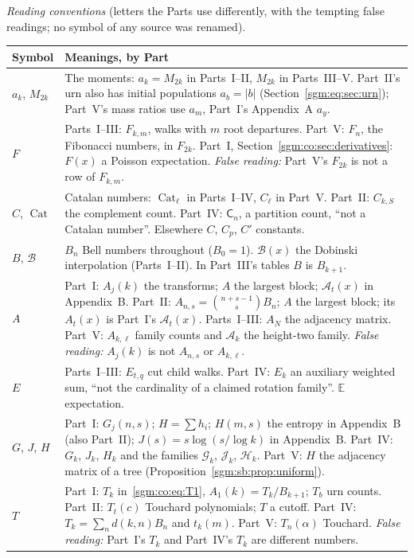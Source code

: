 \documentclass[11pt,letterpaper]{article}
\theoremstyle{remark}\newtheorem{remark}[theorem]{Remark}
\newcommand{\Cat}{\operatorname{Cat}}\newcommand{\E}{\mathbb E}\newcommand{\Prob}{\mathbb P}\newcommand{\ind}{\mathbf 1}
\newcommand{\Gc}{\mathcal G}\newcommand{\Hc}{\mathcal H}\newcommand{\Jc}{\mathcal J}
\newcommand{\Cgood}{\mathsf C}\DeclareMathOperator{\norm}{norm}
\newcommand{\Ac}{\mathcal A}
\theoremstyle{definition}\newtheorem{definition}[theorem]{Definition}
\begin{document}
\medskip
\begingroup\small
\noindent\emph{Reading conventions} (letters the Parts use differently, with
the tempting false readings; no symbol of any source was renamed).\par\smallskip
\renewcommand{\arraystretch}{1.1}
\renewcommand{\theHtable}{sgmguide.\arabic{table}}
\begin{longtable}{@{}>{\raggedright\arraybackslash}p{0.75in}>{\raggedright\arraybackslash}p{5.5in}@{}}
\toprule
Symbol & Meanings, by Part\\
\midrule
\endhead
$a_k$, $M_{2k}$ & The moments: $a_k=M_{2k}$ in Parts~I--II, $M_{2k}$ in Parts~III--V. Part~II's urn also has initial populations $a_b=|b|$ (Section~\ref{sgm:eq:sec:urn}); Part~V's mass ratios use $a_m$, Part~I's Appendix~A $a_y$.\\
$F$ & Parts~I--III: $F_{k,m}$, walks with $m$ root departures. Part~V: $F_n$, the Fibonacci numbers, in $F_{2k}$. Part~I, Section~\ref{sgm:co:sec:derivatives}: $F(x)$ a Poisson expectation. \emph{False reading:} Part~V's $F_{2k}$ is not a row of $F_{k,m}$.\\
$C$, $\Cat$ & Catalan numbers: $\Cat_\ell$ in Parts~I--IV, $C_\ell$ in Part~V. Part~II: $C_{k,S}$ the complement count. Part~IV: $\Cgood_n$, a partition count, ``not a Catalan number''. Elsewhere $C$, $C_p$, $C'$ constants.\\
$B$, $\mathcal B$ & $B_n$ Bell numbers throughout ($B_0=1$). $\mathcal B(x)$ the Dobinski interpolation (Parts~I--II). In Part~III's tables $B$ is $B_{k+1}$.\\
$A$ & Part~I: $A_j(k)$ the transforms; $A$ the largest block; $\mathcal A_t(x)$ in Appendix~B. Part~II: $A_{n,s}=\binom{n+s-1}sB_n$; $A$ the largest block; its $A_t(x)$ is Part~I's $\mathcal A_t(x)$. Parts~I--III: $A_N$ the adjacency matrix. Part~V: $A_{k,\ell}$ family counts and $\Ac_k$ the height-two family. \emph{False reading:} $A_j(k)$ is not $A_{n,s}$ or $A_{k,\ell}$.\\
$E$ & Parts~I--III: $E_{t,q}$ cut child walks. Part~IV: $E_k$ an auxiliary weighted sum, ``not the cardinality of a claimed rotation family''. $\E$ expectation.\\
$G$, $J$, $H$ & Part~I: $G_j(n,s)$; $H=\sum h_i$; $H(m,s)$ the entropy in Appendix~B (also Part~II); $J(s)=s\log(s/\log k)$ in Appendix~B. Part~IV: $G_k$, $J_k$, $H_k$ and the families $\Gc_k$, $\Jc_k$, $\Hc_k$. Part~V: $H$ the adjacency matrix of a tree (Proposition~\ref{sgm:sb:prop:uniform}).\\
$T$ & Part~I: $T_k$ in~\eqref{sgm:co:eq:T1}, $A_1(k)=T_k/B_{k+1}$; $T_b$ urn counts. Part~II: $T_t(c)$ Touchard polynomials; $T$ a cutoff. Part~IV: $T_k=\sum_nd(k,n)B_n$ and $t_k(m)$. Part~V: $T_n(\alpha)$ Touchard. \emph{False reading:} Part~I's $T_k$ and Part~IV's $T_k$ are different numbers.\\

\end{longtable}
\end{document}
